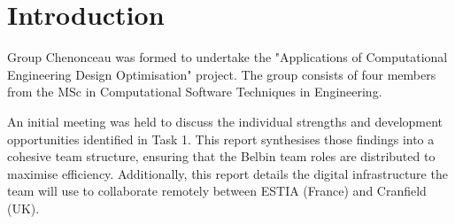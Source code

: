 \section{Introduction}

Group Chenonceau was formed to undertake the "Applications of Computational Engineering Design Optimisation" project. The group consists of four members from the MSc in Computational Software Techniques in Engineering.

An initial meeting was held to discuss the individual strengths and development opportunities identified in Task 1. This report synthesises those findings into a cohesive team structure, ensuring that the Belbin team roles \cite{hoarauTask1} are distributed to maximise efficiency. Additionally, this report details the digital infrastructure the team will use to collaborate remotely between ESTIA (France) and Cranfield (UK).